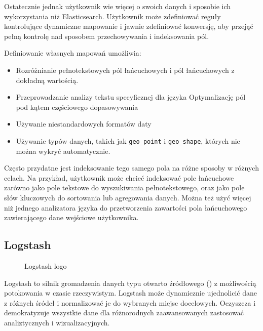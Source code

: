 Ostatecznie jednak użytkownik wie więcej o swoich danych i sposobie ich wykorzystania niż Elasticsearch. Użytkownik może zdefiniować reguły kontrolujące dynamiczne mapowanie i jawnie zdefiniować konwersję, aby przejąć pełną kontrolę nad sposobem przechowywania i indeksowania pól\cite{elasticSearchManualDataIn}.

Definiowanie własnych mapowań umożliwia:

\begin{itemize}
    \item Rozróżnianie pełnotekstowych pól łańcuchowych i pól łańcuchowych z dokładną wartością.
    \item Przeprowadzanie analizy tekstu specyficznej dla języka
    Optymalizację pól pod kątem częściowego dopasowywania
    \item Używanie niestandardowych formatów daty
    \item Używanie typów danych, takich jak \verb|geo_point| i \verb|geo_shape|, których nie można wykryć automatycznie.
\end{itemize}

Często przydatne jest indeksowanie tego samego pola na różne sposoby w różnych celach. Na przykład, użytkownik może chcieć indeksować pole łańcuchowe zarówno jako pole tekstowe do wyszukiwania pełnotekstowego, oraz jako pole słów kluczowych do sortowania lub agregowania danych. Można też użyć więcej niż jednego analizatora języka do przetworzenia zawartości pola łańcuchowego zawierającego dane wejściowe użytkownika\cite{elasticSearchManualDataIn}.

\subsection{Logstash}

\begin{figure}[!htbp]
    \centering
    
    \caption{Logstash logo\cite{logstashMain}}
    \label{fig:enter-label}
\end{figure}

Logstash to silnik gromadzenia danych typu otwarto źródłowego () z możliwością potokowania w czasie rzeczywistym. Logstash może dynamicznie ujednolicić dane z różnych śródeł i normalizować je do wybranych miejsc docelowych. Oczyszcza i demokratyzuje wszystkie dane dla różnorodnych zaawansowanych zastosować analiztycznych i wizualizacyjnych\cite{logstashManualIntroduction}.

